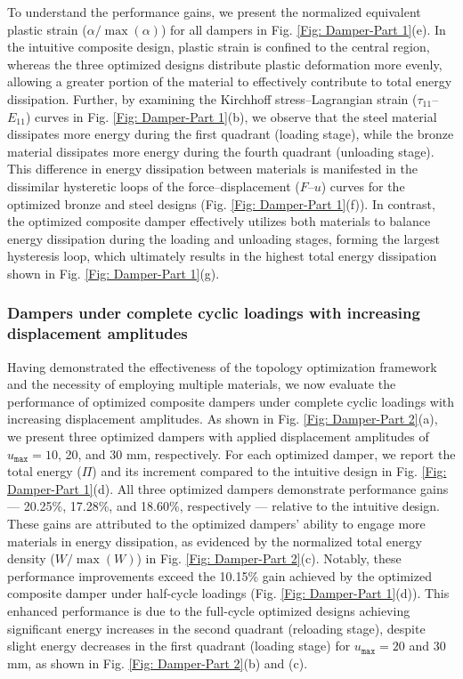 \documentclass[preprint,11pt]{elsarticle}
\theoremstyle{definition}
\begin{document}
To understand the performance gains, we present the normalized equivalent plastic strain ($\alpha/\max (\alpha)$) for all dampers in Fig. \ref{Fig: Damper-Part 1}(e). In the intuitive composite design, plastic strain is confined to the central region, whereas the three optimized designs distribute plastic deformation more evenly, allowing a greater portion of the material to effectively contribute to total energy dissipation. Further, by examining the Kirchhoff stress--Lagrangian strain ($\tau_{11}$--$E_{11}$) curves in Fig. \ref{Fig: Damper-Part 1}(b), we observe that the steel material dissipates more energy during the first quadrant (loading stage), while the bronze material dissipates more energy during the fourth quadrant (unloading stage). This difference in energy dissipation between materials is manifested in the dissimilar hysteretic loops of the force--displacement ($F$--$u$) curves for the optimized bronze and steel designs (Fig. \ref{Fig: Damper-Part 1}(f)). In contrast, the optimized composite damper effectively utilizes both materials to balance energy dissipation during the loading and unloading stages, forming the largest hysteresis loop, which ultimately results in the highest total energy dissipation shown in Fig. \ref{Fig: Damper-Part 1}(g).

\subsubsection{Dampers under complete cyclic loadings with increasing displacement amplitudes}

Having demonstrated the effectiveness of the topology optimization framework and the necessity of employing multiple materials, we now evaluate the performance of optimized composite dampers under complete cyclic loadings with increasing displacement amplitudes. As shown in Fig. \ref{Fig: Damper-Part 2}(a), we present three optimized dampers with applied displacement amplitudes of $u_\texttt{max} = 10$, 20, and 30 mm, respectively. For each optimized damper, we report the total energy ($\Pi$) and its increment compared to the intuitive design in Fig. \ref{Fig: Damper-Part 1}(d). All three optimized dampers demonstrate performance gains --- 20.25\%, 17.28\%, and 18.60\%, respectively --- relative to the intuitive design. These gains are attributed to the optimized dampers' ability to engage more materials in energy dissipation, as evidenced by the normalized total energy density ($W/\max (W)$) in Fig. \ref{Fig: Damper-Part 2}(c). Notably, these performance improvements exceed the 10.15\% gain achieved by the optimized composite damper under half-cycle loadings (Fig. \ref{Fig: Damper-Part 1}(d)). This enhanced performance is due to the full-cycle optimized designs achieving significant energy increases in the second quadrant (reloading stage), despite slight energy decreases in the first quadrant (loading stage) for $u_\texttt{max} = 20$ and 30 mm, as shown in Fig. \ref{Fig: Damper-Part 2}(b) and (c).
\end{document}
